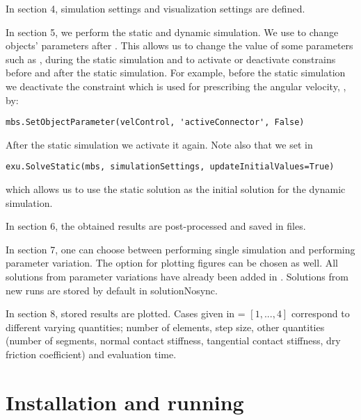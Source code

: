 \ei
\item{In section 4, simulation settings and visualization settings are defined.}
\item{In section 5, we perform the static and dynamic simulation. %
We use  to change objects' parameters after . This allows us to change the value of some parameters such as ,  during the static simulation and to activate or deactivate constrains before and after the static simulation.
For example, before the static simulation we deactivate the constraint which is used for prescribing the angular velocity, , by:
\pythonstyle
\begin{lstlisting}
mbs.SetObjectParameter(velControl, 'activeConnector', False)
\end{lstlisting} 
After the static simulation we activate it again.
Note also that we set  in 
\pythonstyle
\begin{lstlisting}
exu.SolveStatic(mbs, simulationSettings, updateInitialValues=True) 
\end{lstlisting}
which allows us to use the static solution as the initial solution for the dynamic simulation.}
\item{In section 6, the obtained results are post-processed and saved in files.}
\item{In section 7, one can choose between performing single simulation and performing parameter variation.
The option for plotting figures can be chosen as well. All solutions from parameter variations have already been added in . Solutions from new runs are stored by default in solutionNosync.} %
\item{In section 8, stored results are plotted. Cases given in  = $[1,..., 4]$ correspond to different varying quantities; number of elements, step size, other quantities (number of segments, normal contact stiffness, tangential contact stiffness, dry friction coefficient) and evaluation time.}
%

\ei
\section{Installation and running}
